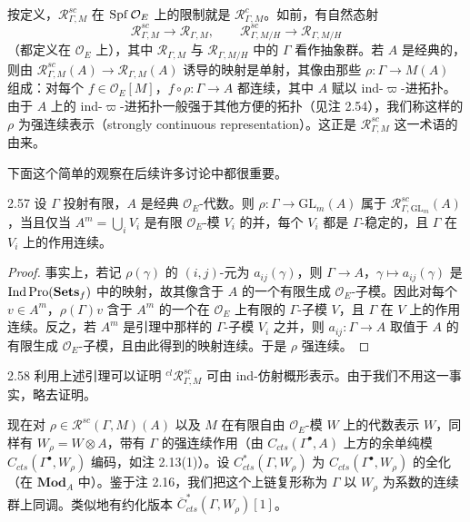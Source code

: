 按定义，$\mathcal R^{sc}_{\Gamma,M}$ 在 $\operatorname{Spf}\mathcal O_E$ 上的限制就是 $\mathcal R^c_{\Gamma,M}$。如前，有自然态射
\[
\mathcal R^{sc}_{\Gamma,M}\to\mathcal R_{\Gamma,M},\qquad
\mathcal R^{sc}_{\Gamma,M/H}\to\mathcal R_{\Gamma,M/H}
\]
（都定义在 $\mathcal O_E$ 上），其中 $\mathcal R_{\Gamma,M}$ 与 $\mathcal R_{\Gamma,M/H}$ 中的 $\Gamma$ 看作抽象群。若 $A$ 是经典的，则由 $\mathcal R^{sc}_{\Gamma,M}(A)\to\mathcal R_{\Gamma,M}(A)$ 诱导的映射是单射，其像由那些 $\rho:\Gamma\to M(A)$ 组成：对每个 $f\in\mathcal O_E[M]$，$f\circ\rho:\Gamma\to A$ 都连续，其中 $A$ 赋以 ind-$\varpi$-进拓扑。由于 $A$ 上的 ind-$\varpi$-进拓扑一般强于其他方便的拓扑（见注 2.54），我们称这样的 $\rho$ 为强连续表示（strongly continuous representation）。这正是 $\mathcal R^{sc}_{\Gamma,M}$ 这一术语的由来。

下面这个简单的观察在后续许多讨论中都很重要。

\begin{lem}{2.57}
设 $\Gamma$ 投射有限，$A$ 是经典 $\mathcal O_E$-代数。则 $\rho:\Gamma\to\mathrm{GL}_m(A)$ 属于 $\mathcal R^{sc}_{\Gamma,\mathrm{GL}_m}(A)$，当且仅当 $A^m=\bigcup_i V_i$ 是有限 $\mathcal O_E$-模 $V_i$ 的并，每个 $V_i$ 都是 $\Gamma$-稳定的，且 $\Gamma$ 在 $V_i$ 上的作用连续。
\end{lem}

\begin{proof}
事实上，若记 $\rho(\gamma)$ 的 $(i,j)$-元为 $a_{ij}(\gamma)$，则 $\Gamma\to A$，$\gamma\mapsto a_{ij}(\gamma)$ 是 $\operatorname{Ind}\mathrm{Pro}(\mathbf{Sets}_f)$ 中的映射，故其像含于 $A$ 的一个有限生成 $\mathcal O_E$-子模。因此对每个 $v\in A^m$，$\rho(\Gamma)v$ 含于 $A^m$ 的一个在 $\mathcal O_E$ 上有限的 $\Gamma$-子模 $V$，且 $\Gamma$ 在 $V$ 上的作用连续。反之，若 $A^m$ 是引理中那样的 $\Gamma$-子模 $V_i$ 之并，则 $a_{ij}:\Gamma\to A$ 取值于 $A$ 的有限生成 $\mathcal O_E$-子模，且由此得到的映射连续。于是 $\rho$ 强连续。
\end{proof}

\begin{rem}{2.58}
利用上述引理可以证明 ${}^{cl}\mathcal R^{sc}_{\Gamma,M}$ 可由 ind-仿射概形表示。由于我们不用这一事实，略去证明。
\end{rem}

现在对 $\rho\in\mathcal R^{sc}(\Gamma,M)(A)$ 以及 $M$ 在有限自由 $\mathcal O_E$-模 $W$ 上的代数表示 $W$，同样有 $W_\rho=W\otimes A$，带有 $\Gamma$ 的强连续作用（由 $C_{cts}(\Gamma^{\bullet},A)$ 上方的余单纯模 $C_{cts}(\Gamma^{\bullet},W_\rho)$ 编码，如注 2.13(1)）。设 $C^*_{cts}(\Gamma,W_\rho)$ 为 $C_{cts}(\Gamma^{\bullet},W_\rho)$ 的全化（在 $\mathbf{Mod}_A$ 中）。鉴于注 2.16，我们把这个上链复形称为 $\Gamma$ 以 $W_\rho$ 为系数的连续群上同调。类似地有约化版本 $\overline{C}^*_{cts}(\Gamma,W_\rho)[1]$。

